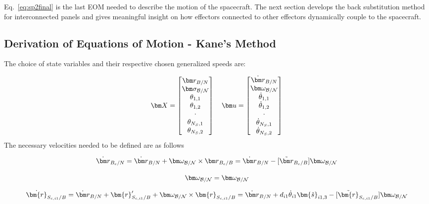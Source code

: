Eq.~\eqref{eq:sp2final} is the last EOM needed to describe the motion of the spacecraft. The next section develops the back substitution method for interconnected panels and gives meaningful insight on how effectors connected to other effectors dynamically couple to the spacecraft.

\subsection{Derivation of Equations of Motion - Kane's Method}

The choice of state variables and their respective chosen generalized speeds are:

\begin{equation}
	\bm X =
	\begin{bmatrix}
		\bm r_{B/N}\\
		\bm \sigma_{\cal{B/N}}\\
		\theta_{1,1}\\
		\theta_{1,2}\\
		\cdot\\
		\theta_{N_S,1}\\
		\theta_{N_S,2}
	\end{bmatrix}
	\quad
	\bm u = \begin{bmatrix}
		\dot{\bm r}_{B/N}\\
		\bm \omega_{\cal{B/N}}\\
		\dot{\theta}_{1,1}\\
		\dot{\theta}_{1,2}\\
		\cdot\\
		\dot{\theta}_{N_S,1}\\
		\dot{\theta}_{N_S,2}
	\end{bmatrix}
\end{equation}
The necessary velocities needed to be defined are as follows

\begin{equation}
	\dot{\bm r}_{B_c/N} = \dot{\bm r}_{B/N} + \bm \omega_{\cal{B/N}} \times {\bm r}_{B_c/B} = \dot{\bm r}_{B/N}  - [\tilde{{\bm r}}_{B_c/B}] \bm \omega_{\cal{B/N}} \\
\end{equation}

\begin{equation}
	\bm \omega_{\cal{B/N}} = \bm \omega_{\cal{B/N}}
\end{equation}

\begin{equation}
	\dot{\bm{r}}_{S_{c,{i1}}/B} = \dot{\bm r}_{B/N} + \bm{r}'_{S_{c,{i1}}/B} + \bm \omega_{\cal{B/N}} \times \bm{r}_{S_{c,{i1}}/B} = \dot{\bm r}_{B/N} + d_{i1} \dot{\theta}_{i1} \bm{\hat{s}}_{i1,3}  - [\tilde{\bm{r}}_{S_{c,{i1}}/B}] \bm \omega_{\cal{B/N}}
\end{equation}

